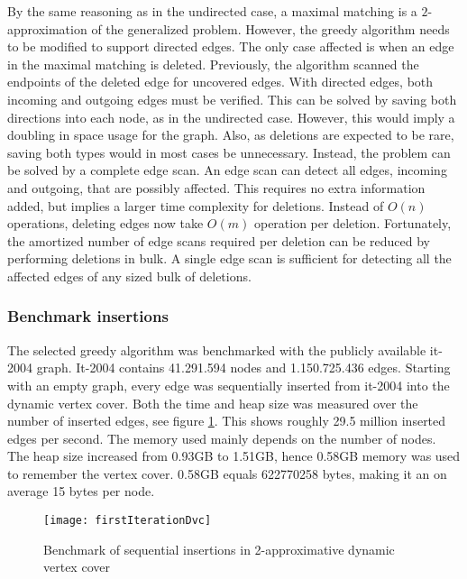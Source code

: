 By the same reasoning as in the undirected case, a maximal matching is a $2$-approximation of the generalized problem. However, the greedy algorithm needs to be modified to support directed edges. The only case affected is when an edge in the maximal matching is deleted. Previously, the algorithm scanned the endpoints of the deleted edge for uncovered edges. With directed edges, both incoming and outgoing edges must be verified. This can be solved by saving both directions into each node, as in the undirected case. However, this would imply a doubling in space usage for the graph. Also, as deletions are expected to be rare, saving both types would in most cases be unnecessary. Instead, the problem can be solved by a complete edge scan. An edge scan can detect all edges, incoming and outgoing, that are possibly affected. This requires no extra information added, but implies a larger time complexity for deletions. Instead of $O(n)$ operations, deleting edges now take $O(m)$ operation per deletion. Fortunately, the amortized number of edge scans required per deletion can be reduced by performing deletions in bulk. A single edge scan is sufficient for detecting all the affected edges of any sized bulk of deletions. 

\subsubsection{Benchmark insertions}
The selected greedy algorithm was benchmarked with the publicly available it-2004 graph. It-2004 contains 41.291.594 nodes and 1.150.725.436 edges. Starting with an empty graph, every edge was sequentially inserted from it-2004 into the dynamic vertex cover. Both the time and heap size was measured over the number of inserted edges, see figure \ref{fig:firstIterationDvc}. This shows roughly 29.5 million inserted edges per second. The memory used mainly depends on the number of nodes. The heap size increased from 0.93GB to 1.51GB, hence 0.58GB memory was used to remember the vertex cover. 0.58GB equals 622770258 bytes, making it an on average 15 bytes per node. 


\begin{figure}[h]
\centering
\texttt{[image: firstIterationDvc]}    
\captionsetup{justification=centering}
\caption {Benchmark of sequential insertions in 2-approximative dynamic vertex cover}
\label{fig:firstIterationDvc}
\end{figure}

